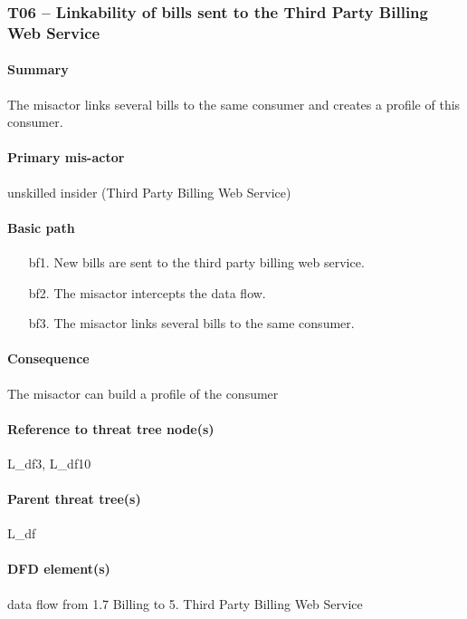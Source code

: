 \subsubsection{T06 -- Linkability of bills sent to the Third Party Billing Web Service}

\paragraph{Summary} The misactor links several bills to the same consumer and
creates a profile of this consumer. 

\paragraph{Primary mis-actor} unskilled insider (Third Party Billing Web
Service)

\paragraph{Basic path}
\begin{enumerate}
	\item[bf1.] New bills are sent to the third party billing web service.
	\item[bf2.] The misactor intercepts the data flow.
	\item[bf3.] The misactor links several bills to the same consumer.
\end{enumerate}

\paragraph{Consequence} The misactor can build a profile of the consumer

\paragraph{Reference to threat tree node(s)} L\_df3, L\_df10

\paragraph{Parent threat tree(s)} L\_df

\paragraph{DFD element(s)} data flow from 1.7 Billing to 5. Third Party Billing
Web Service

